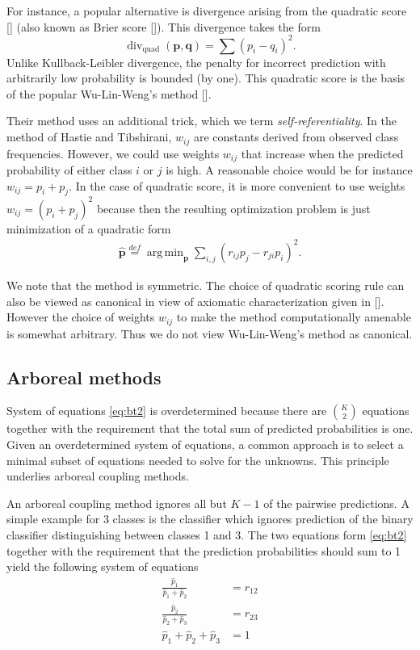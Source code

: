 \documentclass[twoside,11pt]{article}
\DeclareMathOperator*{\divm}{div}
\DeclareMathOperator*{\argmin}{arg\,min}
\begin{document}
For instance, a popular alternative is divergence arising from the quadratic  score [\cite{gneiting2007strictly}] (also known as Brier score [\cite{brier1950verification}]). This divergence takes the form
$$
\divm\nolimits_\textrm{quad} (\boldsymbol{p}, \boldsymbol{q})= \sum (p_i - q_i)^2.
$$
Unlike Kullback-Leibler divergence, the penalty for incorrect prediction with arbitrarily low probability is bounded (by one). This quadratic score is the basis of the popular Wu-Lin-Weng's method [\cite{wu2004probability}]. 

Their method uses an additional trick, which we term \emph{self-referentiality}. In the method of Hastie and Tibshirani, $w_{ij}$ are constants derived from observed class frequencies. However, we could use weights $w_{ij}$ that increase when the predicted probability of either class $i$ or $j$ is high. A reasonable choice would be for instance $w_{ij}= p_i + p_j$. In the case of quadratic score, it is more convenient to use weights $w_{ij} = (p_i + p_j)^2$ because then the resulting optimization problem is just minimization of a quadratic form
\begin{align*}
\hat{\boldsymbol{p}} \stackrel{def}{=} \argmin_{\boldsymbol{p}} \sum_{i,j} (r_{ij}p_j - r_{ji}p_i)^2.
\end{align*}

We note that the method is symmetric. The choice of quadratic scoring rule can also be viewed as canonical in view of axiomatic characterization given in  [\cite{selten1998axiomatic}].  However the choice of weights $w_{ij}$ to make the method computationally amenable is somewhat arbitrary. Thus we do not view Wu-Lin-Weng's method as canonical.

\subsection{Arboreal methods}

System of equations \eqref{eq:bt2} is overdetermined because there are $\binom{K}{2}$ equations together with the requirement that the total sum of predicted probabilities is one.  Given an overdetermined system of equations, a common approach is to select a minimal subset of equations needed to solve for the unknowns. This principle underlies arboreal coupling methods.

An arboreal coupling method ignores all but $K-1$ of the pairwise predictions. A simple example for 3 classes is the classifier which ignores prediction of the binary classifier distinguishing between classes 1 and 3. The two equations form \eqref{eq:bt2} together with the requirement that the prediction probabilities should sum to 1 yield the following system of equations
\begin{equation}
	\begin{split}
		\frac{\hat p_1}{\hat p_1 + \hat p_2} &= {r}_{12}\\
		\frac{\hat p_2}{\hat p_2 + \hat p_3} &= {r}_{23}\\
		\hat p_1 + \hat p_2 + \hat p_3 &= 1
	\end{split}
	\label{eq:arb1}
\end{equation}
\end{document}
